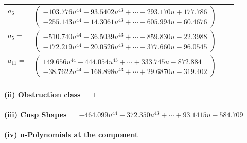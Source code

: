 \documentclass[1p]{elsarticle_modified}
\theoremstyle{definition}
\begin{document}
\begin{tabular}{m{7pt} m{180pt} m{7pt} m{180pt} }
\flushright $a_{6}=$&$\begin{pmatrix}-103.776 u^{44}+93.5402 u^{43}+\cdots-293.170 u+177.786\\-255.143 u^{44}+14.3061 u^{43}+\cdots-605.994 u-60.4676\end{pmatrix}$ \\
\flushright $a_{5}=$&$\begin{pmatrix}-510.740 u^{44}+36.5039 u^{43}+\cdots-859.830 u-22.3988\\-172.219 u^{44}-20.0526 u^{43}+\cdots-377.660 u-96.0545\end{pmatrix}$ \\
\flushright $a_{11}=$&$\begin{pmatrix}149.656 u^{44}-444.054 u^{43}+\cdots+333.745 u-872.884\\-38.7622 u^{44}-168.898 u^{43}+\cdots+29.6870 u-319.402\end{pmatrix}$\\&\end{tabular}
\flushleft \textbf{(ii) Obstruction class $= 1$}\\~\\
\flushleft \textbf{(iii) Cusp Shapes $= -464.099 u^{44}-372.350 u^{43}+\cdots+93.1415 u-584.709$}\\~\\
\newpage\renewcommand{\arraystretch}{1}
\flushleft \textbf{(iv) u-Polynomials at the component}\newline \\
\end{document}
